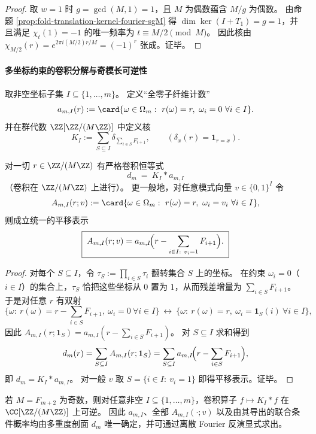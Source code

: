 \begin{proof}
取 \(w=1\) 时 \(g=\gcd(M,1)=1\)，且 \(M\) 为偶数蕴含 \(M/g\) 为偶数。
由命题 \ref{prop:fold-translation-kernel-fourier-sgM} 得 \(\dim\ker(I+T_1)=g=1\)，并且满足 \(\chi_t(1)=-1\) 的唯一频率为 \(t\equiv M/2\pmod M\)。
因此核由 \(\chi_{M/2}(r)=e^{2\pi i (M/2)r/M}=(-1)^r\) 张成。证毕。
\end{proof}

\paragraph{多坐标约束的卷积分解与奇模长可逆性}
取非空坐标子集 \(I\subseteq\{1,\dots,m\}\)。
定义“全零子纤维计数”
\[
a_{m,I}(r):=\card\{\omega\in\Omega_m:\ r(\omega)=r,\ \omega_i=0\ \forall i\in I\}.
\]
并在群代数 \(\ZZ[\ZZ/(M\ZZ)]\) 中定义核
\[
K_I:=\sum_{S\subseteq I}\delta_{\sum_{i\in S}F_{i+1}},
\qquad
(\delta_x(r)=\mathbf 1_{r=x}).
\]

\begin{proposition}[有限坐标约束的卷积分解]\label{prop:fold-fiber-subset-convolution}
对一切 \(r\in\ZZ/(M\ZZ)\) 有严格卷积恒等式
\[
\boxed{\;
d_m\ =\ K_I*a_{m,I}\;}
\]
（卷积在 \(\ZZ/(M\ZZ)\) 上进行）。
更一般地，对任意模式向量 \(v\in\{0,1\}^I\) 令
\[
A_{m,I}(r;v):=\card\{\omega\in\Omega_m:\ r(\omega)=r,\ \omega_i=v_i\ \forall i\in I\},
\]
则成立统一的平移表示
\[
\boxed{\;
A_{m,I}(r;v)=a_{m,I}\!\Bigl(r-\sum_{i\in I:\ v_i=1}F_{i+1}\Bigr).\;}
\]
\end{proposition}

\begin{proof}
对每个 \(S\subseteq I\)，令 \(\tau_S:=\prod_{i\in S}\tau_i\) 翻转集合 \(S\) 上的坐标。
在约束 \(\omega_i=0\)（\(i\in I\)）的集合上，\(\tau_S\) 恰把这些坐标从 \(0\) 置为 \(1\)，从而残差增量为 \(\sum_{i\in S}F_{i+1}\)。
于是对任意 \(r\) 有双射
\[
\{\omega:\ r(\omega)=r-\textstyle\sum_{i\in S}F_{i+1},\ \omega_i=0\ \forall i\in I\}
\ \longleftrightarrow\
\{\omega:\ r(\omega)=r,\ \omega_i=\mathbf 1_S(i)\ \forall i\in I\},
\]
因此
\(
A_{m,I}(r;\mathbf 1_S)=a_{m,I}(r-\sum_{i\in S}F_{i+1})
\)。
对 \(S\subseteq I\) 求和得到
\[
d_m(r)=\sum_{S\subseteq I}A_{m,I}(r;\mathbf 1_S)=\sum_{S\subseteq I}a_{m,I}\!\Bigl(r-\sum_{i\in S}F_{i+1}\Bigr),
\]
即 \(d_m=K_I*a_{m,I}\)。
对一般 \(v\) 取 \(S=\{i\in I:\ v_i=1\}\) 即得平移表示。证毕。
\end{proof}

\begin{corollary}[奇模长下的可逆重建]\label{cor:fold-fiber-conditional-reconstruction-odd-modulus}
若 \(M=F_{m+2}\) 为奇数，则对任意非空 \(I\subseteq\{1,\dots,m\}\)，卷积算子
\(
f\mapsto K_I*f
\)
在 \(\CC[\ZZ/(M\ZZ)]\) 上可逆。
因此 \(a_{m,I}\)、全部 \(A_{m,I}(\cdot;v)\) 以及由其导出的联合条件概率均由多重度剖面 \(d_m\) 唯一确定，并可通过离散 Fourier 反演显式求出。
\end{corollary}

